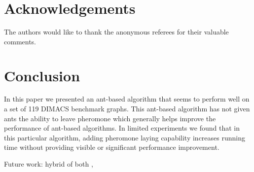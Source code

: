 \documentclass[11pt]{article}
\begin{document}
\begin{table}[ht!]
\begin{footnotesize}
\begin{center}
\begin{tabular}{|l||c|cc|c||c|cc|c|}
\hline
\end{tabular}
\end{center}
\end{footnotesize}
\end{table}


\section{Acknowledgements}

The authors would like to thank the anonymous referees for their valuable comments.

\section{Conclusion}\label{conclusion}


  
In this paper we presented an ant-based algorithm that seems to perform well
on a set of 119 DIMACS benchmark graphs.  This ant-based algorithm has not given ants
the ability to leave pheromone which generally helps improve the performance
of ant-based algorithms.  In limited experiments we found that in this
particular algorithm, adding pheromone laying capability increases
running time without providing visible or significant performance
improvement. 

Future work: hybrid of both , 





\end{document}
